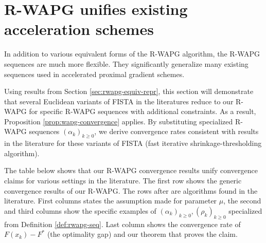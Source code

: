 \documentclass[12pt]{article}
\begin{document}
\section{R-WAPG unifies existing acceleration schemes}\label{sec:rwapg-literatures}
    In addition to various equivalent forms of the R-WAPG algorithm, the R-WAPG sequences are much more flexible.
    They significantly generalize many existing sequences used in accelerated proximal gradient schemes.
    \par
    Using results from Section \ref{sec:rwapg-equiv-repr}, this section will demonstrate that several Euclidean variants of FISTA in the literatures reduce to our R-WAPG for specific R-WAPG sequences with additional constraints.
    As a result, Proposition \ref{prop:wapg-convergence} applies. By substituting specialized R-WAPG sequences $(\alpha_k)_{k \ge 0}$, we derive convergence rates consistent with results in the literature for these variants of FISTA (fast iterative shrinkage-thresholding algorithm).
    \par
    The table below shows that our R-WAPG convergence results unify convergence claims for various settings in the literature.
    The first row shows the generic convergence results of our R-WAPG.
    The rows after are algorithms found in the literature.
    First columns states the assumption made for parameter $\mu$, the second and third columns show the specific examples of $(\alpha_k)_{k \ge 0}, (\rho_k)_{k \ge0}$ specialized from Definition \ref{def:rwapg-seq}.
    Last column shows the convergence rate of $F(x_k) - F^*$ (the optimality gap) and our theorem that proves the claim.
\end{document}
